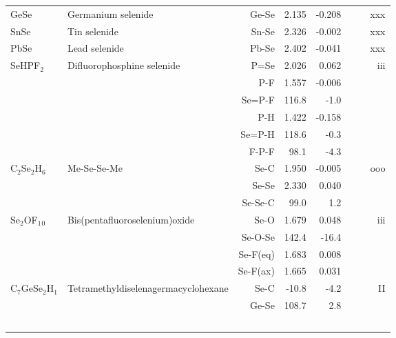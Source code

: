 \begin{table}
\begin{center}
\begin{tabular}{llrrrrrr}
 GeSe        & Germanium selenide                 &Ge-Se          &     2.135   &    -0.208 &  &  &   xxx \\
 SnSe        & Tin selenide                       &Sn-Se          &     2.326   &    -0.002 &  &  &   xxx \\
 PbSe        & Lead selenide                      &Pb-Se          &     2.402   &    -0.041 &  &  &   xxx \\
 SeHPF$_2$      & Difluorophosphine selenide         &P=Se           &     2.026   &     0.062 &  &  &   iii \\
             &                                    &P-F            &     1.557   &    -0.006 &  &  &       \\
             &                                    &Se=P-F       &     116.8   &      -1.0 &  &    &       \\
             &                                    &P-H            &     1.422   &    -0.158 &  &  &       \\
             &                                    &Se=P-H       &     118.6   &      -0.3 &  &    &       \\
             &                                    &F-P-F        &      98.1   &      -4.3 &  &    &       \\
 C$_2$Se$_2$H$_6$     & Me-Se-Se-Me                        &Se-C           &     1.950   &    -0.005 &  &  &   ooo \\
             &                                    &Se-Se          &     2.330   &     0.040 &  &  &       \\
             &                                    &Se-Se-C      &      99.0   &       1.2 &  &    &       \\
 Se$_2$OF$_1$$_0$     & Bis(pentafluoroselenium)oxide      &Se-O           &     1.679   &     0.048 &  &  &   iii \\
             &                                    &Se-O-Se      &     142.4   &     -16.4 &  &    &       \\
             &                                    &Se-F(eq)       &     1.683   &     0.008 &  &  &       \\
             &                                    &Se-F(ax)       &     1.665   &     0.031 &  &  &       \\
 C$_7$GeSe$_2$H$_1$   & Tetramethyldiselenagermacyclohexane&Se-C         &     -10.8   &      -4.2 &  &    &    II \\
             &                                    &Ge-Se        &     108.7   &       2.8 &  &    &       \\
$$
\end{tabular}
\end{center}
\end{table}
